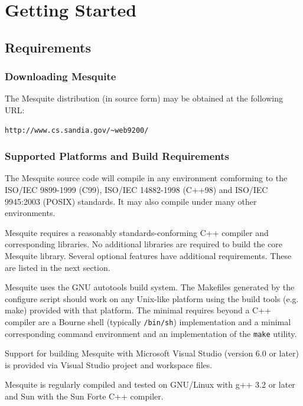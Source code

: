 \chapter{Getting Started} \label{sec:basics}

\section{Requirements}

\subsection{Downloading Mesquite}
The Mesquite distribution (in source form) may be obtained at the following URL:
\begin{verbatim}
http://www.cs.sandia.gov/~web9200/
\end{verbatim}

\subsection{Supported Platforms and Build Requirements}
The Mesquite source code will compile in any environment comforming to the ISO/IEC 9899-1999 (C99), ISO/IEC 14882-1998 (C++98) and ISO/IEC 9945:2003 (POSIX) standards.
It may also compile under many other environments.

Mesquite requires a reasonably standards-conforming C++ compiler and corresponding libraries.  No additional libraries are required to build the core Mesquite library.
Several optional features have additional requirements.  These are listed in the next section.

Mesquite uses the GNU autotools build system.  The Makefiles generated by the
configure script should work on any Unix-like platform using the build tools
(e.g. make) provided with that platform.  The minimal requires beyond a C++
compiler are a Bourne shell (typically \texttt{/bin/sh}) implementation and
a minimal corresponding command environment
and an implementation of the \texttt{make} utility.

Support for building Mesquite with Microsoft Visual Studio (version 6.0 or later) is provided via Visual Studio project and workspace files.

Mesquite is regularly compiled and tested on GNU/Linux with g++ 3.2 or later and Sun with the Sun Forte C++ compiler.  

